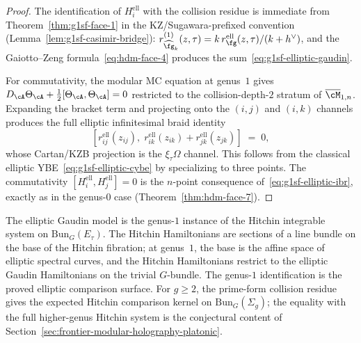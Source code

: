 \begin{proof}
The identification of $H_i^{\mathrm{ell}}$ with the collision residue
is immediate from Theorem~\ref{thm:g1sf-face-1} in the
KZ/Sugawara-prefixed convention (Lemma~\ref{lem:g1sf-casimir-bridge}):
$r_{\widehat{\fg}_k}^{(1)}(z, \tau) = k\,r^{\mathrm{ell}}_\fg(z,\tau)/(k+h^\vee)$,
and the Gaiotto--Zeng formula~\eqref{eq:hdm-face-4} produces the
sum~\eqref{eq:g1sf-elliptic-gaudin}.

For commutativity, the modular MC equation at genus~$1$ gives
$D_\cA \Theta_\cA + \frac{1}{2}[\Theta_\cA, \Theta_\cA] = 0$
restricted to the collision-depth-$2$ stratum of $\overline{\cM}_{1,n}$.
Expanding the bracket term and projecting onto the $(i,j)$ and
$(i,k)$ channels produces the full elliptic infinitesimal braid
identity
\begin{equation}\label{eq:g1sf-elliptic-ibr}
[r^{\mathrm{ell}}_{ij}(z_{ij}),\;
r^{\mathrm{ell}}_{ik}(z_{ik})
+r^{\mathrm{ell}}_{jk}(z_{jk})]
\;=\;
0,
\end{equation}
whose Cartan/KZB projection is the $\xi_\tau\Omega$ channel. This
follows from the classical elliptic YBE~\eqref{eq:g1sf-elliptic-cybe}
by specializing to three points. The
commutativity $[H_i^{\mathrm{ell}}, H_j^{\mathrm{ell}}] = 0$ is the
$n$-point consequence of~\eqref{eq:g1sf-elliptic-ibr}, exactly as in
the genus-$0$ case (Theorem~\ref{thm:hdm-face-7}).
\end{proof}

\begin{remark}
\label{rem:g1sf-hitchin}
The elliptic Gaudin model is the genus-$1$ instance of the Hitchin
integrable system on $\mathrm{Bun}_G(E_\tau)$. The Hitchin
Hamiltonians are sections of a line bundle on the base of the Hitchin
fibration; at genus~$1$, the base is the affine space of elliptic
spectral curves, and the Hitchin Hamiltonians restrict to the
elliptic Gaudin Hamiltonians on the trivial $G$-bundle. The
genus-$1$ identification is the proved elliptic comparison surface.
For $g\geq2$, the prime-form collision residue gives the expected
Hitchin comparison kernel on $\mathrm{Bun}_G(\Sigma_g)$; the equality
with the full higher-genus Hitchin system is the conjectural content of
Section~\ref{sec:frontier-modular-holography-platonic}.
\end{remark}



